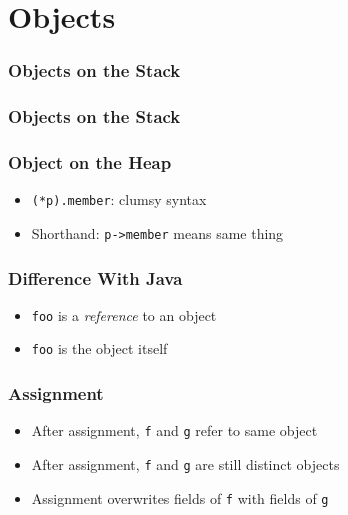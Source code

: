 \section{Objects}
\frame{\tableofcontents[currentsection]}

\begin{frame}
  \frametitle{Objects on the Stack}
\end{frame}

\begin{frame}
  \frametitle{Objects on the Stack}
\end{frame}

\begin{frame}
  \frametitle{Object on the Heap}
  \begin{overprint}
  \end{overprint}
  \begin{itemize}
    \item \texttt{(*p).member}: clumsy syntax
    \item Shorthand: \texttt{p->member} means same thing
  \end{itemize}
\end{frame}

\begin{frame}
  \frametitle{Difference With Java}
  \begin{itemize}
    \item \texttt{foo} is a \emph{reference} to an object
  \end{itemize}
  \structure{\cpp}
  \begin{itemize}
    \item \texttt{foo} is the object itself
  \end{itemize}
\end{frame}

\begin{frame}
  \frametitle{Assignment}
  \begin{itemize}
    \item After assignment, \texttt{f} and \texttt{g} refer to same object
  \end{itemize}
  \structure{\cpp}
  \begin{itemize}
    \item After assignment, \texttt{f} and \texttt{g} are still distinct objects
    \item Assignment overwrites fields of \texttt{f} with fields of \texttt{g}
  \end{itemize}
\end{frame}

